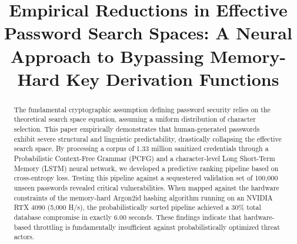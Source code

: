 \documentclass[conference]{IEEEtran}
\begin{document}
\title{Empirical Reductions in Effective Password Search Spaces: A Neural Approach to Bypassing Memory-Hard Key Derivation Functions}

\author{
\and
{}
\and
{}
\and
{}
\and
{}
}

\maketitle

\begin{abstract}
The fundamental cryptographic assumption defining password security relies on the theoretical search space equation, assuming a uniform distribution of character selection. This paper empirically demonstrates that human-generated passwords exhibit severe structural and linguistic predictability, drastically collapsing the effective search space. By processing a corpus of 1.33 million sanitized credentials through a Probabilistic Context-Free Grammar (PCFG) and a character-level Long Short-Term Memory (LSTM) neural network, we developed a predictive ranking pipeline based on cross-entropy loss. Testing this pipeline against a sequestered validation set of 100,000 unseen passwords revealed critical vulnerabilities. When mapped against the hardware constraints of the memory-hard Argon2id hashing algorithm running on an NVIDIA RTX 4090 (5,000 H/s), the probabilistically sorted pipeline achieved a 30\% total database compromise in exactly 6.00 seconds. These findings indicate that hardware-based throttling is fundamentally insufficient against probabilistically optimized threat actors.
\end{abstract}
\end{document}
